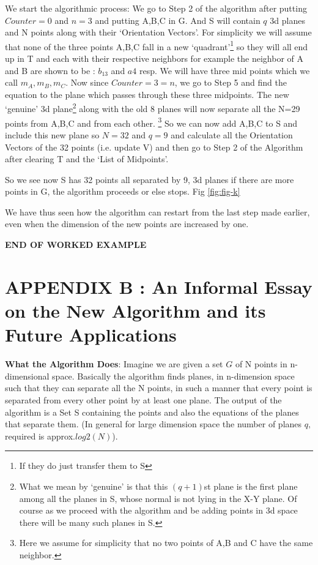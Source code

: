 \documentclass[english]{article}
\begin{document}
We start the algorithmic process: We go to Step 2 of the algorithm after putting $Counter=0$ and $n=3$ and putting A,B,C in G. And S will contain $q$ 3d planes and N points along with their `Orientation Vectors'. For simplicity we will assume that none of the three points A,B,C fall in a new `quadrant'\footnote{If they do just transfer them to S} so they will all end up in T and each with their respective neighbors for example the neighbor of A and B are shown to be : $b_{13}$ and $a{4}$ resp. We will have three mid points which we call $m_A, m_B, m_C$. Now since $Counter = 3 = n$, we go to Step 5 and find the equation to the plane which passes through these three midpoints. The new `genuine' 3d plane\footnote{What we mean by `genuine' is that this $(q+1)$st plane is the first plane among all the planes in S, whose normal is not lying in the X-Y plane.  Of course as we proceed with the algorithm and be adding points in 3d space there will be many such planes in S.}   along with the old 8 planes will now separate all the N=29 points from A,B,C and from each other. \footnote{Here we assume for simplicity that no two points of A,B and C have the same neighbor.} So we can now add A,B,C to S and include this new plane so  $N=32$ and $q=9$ and calculate all the Orientation Vectors of the 32 points (i.e. update V) and then go to Step 2 of the Algorithm after clearing T and the `List of Midpoints'.

 So we see now S has 32 points all separated by 9, 3d planes if there are more points in G, the algorithm proceeds or else stops. Fig \ref{fig:fig-k}

We have thus seen how the algorithm can restart from the last step made earlier, even when the dimension of the new points are increased by one.



\textbf{END OF WORKED EXAMPLE}


\section{APPENDIX  B : An Informal Essay on the New Algorithm and its Future Applications}


\textbf{\large What the Algorithm Does}: Imagine we are given a set
$G$ of N points in n-dimensional space. Basically the algorithm finds
planes, in n-dimension space such that they can separate all the N
points, in such a manner that every point is separated from every
other point by at least one plane. The output of the algorithm is
a Set S containing the points and also the equations of the planes
that separate them. (In general for large dimension space the number
of planes $q,$required is approx.$log2(N)$).
\end{document}
